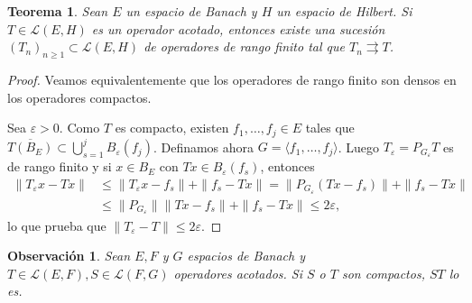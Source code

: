 \documentclass[11pt]{report}
\theoremstyle{colored}
\newtheorem{theorem}{Teorema}[section]
\newtheorem{remark}{Observación}[section]
\newcommand{\eps}{\varepsilon}
\begin{document}
\begin{theorem} Sean $E$ un espacio de Banach y $H$ un espacio de Hilbert. Si $T \in \mathscr{L}(E,H)$ es un operador acotado, entonces existe una sucesión $(T_n)_{n \geq 1} \subset  \mathscr{L}(E,H)$ de operadores de rango finito tal que $T_n \rightrightarrows T$.
\end{theorem}
\begin{proof} Veamos equivalentemente que los operadores de rango finito son densos en los operadores compactos.

Sea $\eps > 0$. Como $T$ es compacto, existen $f_1, \dots, f_j \in E$ tales que
$\overline{T(B_E)} \subset \bigcup_{s=1}^jB_\eps(f_j)$. Definamos ahora $G = \langle f_1, \dots, f_j \rangle$. Luego $T_\eps = P_{G_\eps}T$ es de rango finito y si $x \in B_E$ con $Tx \in B_\eps(f_s)$, entonces 
\begin{align*}
\|T_\eps x - Tx\| &\leq \|T_\eps x - f_s\| + \|f_s -Tx\| = \|P_{G_\eps}(Tx - f_s)\| + \|f_s -Tx\|\\
&\leq \|P_{G_\eps}\|\|Tx - f_s\| + \|f_s - Tx\| \leq 2\eps,
\end{align*}
lo que prueba que $\|T_\eps -T\| \leq 2\eps$.
\end{proof}

\begin{remark} Sean $E,F$ y $G$ espacios de Banach y $T \in \mathscr{L}(E,F), S \in \mathscr{L}(F,G)$ operadores acotados. Si $S$ o $T$ son compactos, $ST$ lo es.
\end{remark}
\end{document}
